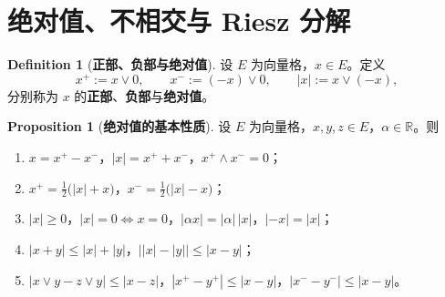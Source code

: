 \documentclass[oneside]{book}
\theoremstyle{definition}
\newcommand{\R}{\mathbb{R}}
\theoremstyle{definition}
\newtheorem{proposition}{Proposition}[section]
\newtheorem{definition}{Definition}[section]
\begin{document}
	
	\section{绝对值、不相交与 Riesz 分解}
	
	\begin{definition}[\bfseries{正部、负部与绝对值}]
		设 $E$ 为向量格，$x\in E$。定义
		\[
		x^{+}:=x\vee0,\qquad x^{-}:=(-x)\vee0,\qquad |x|:=x\vee(-x),
		\]
		分别称为 $x$ 的\textbf{正部}、\textbf{负部}与\textbf{绝对值}。
	\end{definition}
	
	\begin{proposition}[\bfseries{绝对值的基本性质}]
		设 $E$ 为向量格，$x,y,z\in E$，$\alpha\in\R$。则
		\begin{enumerate}[label=(\arabic*),leftmargin=2.2em,itemsep=0.1em,topsep=0.3em]
			\item $x=x^{+}-x^{-}$，$|x|=x^{+}+x^{-}$，$x^{+}\wedge x^{-}=0$；
			\item $x^{+}=\tfrac12\big(|x|+x\big)$，$x^{-}=\tfrac12\big(|x|-x\big)$；
			\item $|x|\geqslant0$，$|x|=0\iff x=0$，$|\alpha x|=|\alpha|\,|x|$，$|-x|=|x|$；
			\item $|x+y|\leqslant|x|+|y|$，$\big||x|-|y|\big|\leqslant|x-y|$；
			\item $|x\vee y-z\vee y|\leqslant|x-z|$，$|x^{+}-y^{+}|\leqslant|x-y|$，$|x^{-}-y^{-}|\leqslant|x-y|$。
		\end{enumerate}
	\end{proposition}
	
\end{document}
